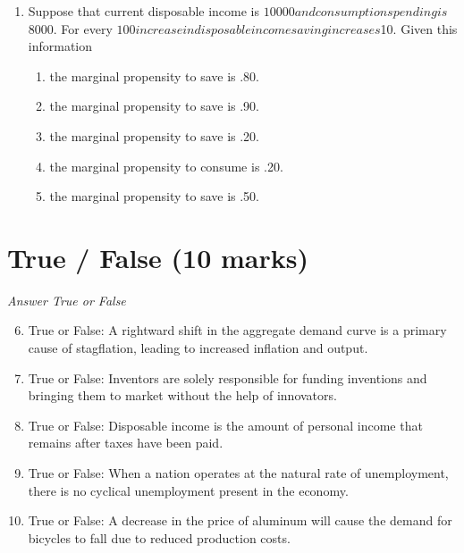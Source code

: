 \documentclass[12pt]{article}
\begin{document}
\begin{enumerate}[label=\arabic*.]
\begin{enumerate}[label=(\alph*)]
    \item A method that minimizes the time taken to produce a product
    \item A method that uses more of all inputs to increase output
    \item A method that produces the highest quantity of output
    \item A method that relies solely on the latest technology
    \item A method that achieves the fastest production speed regardless of resource usage
\end{enumerate}
\item Suppose that current disposable income is $10000 and consumption spending is $8000. For every $100 increase in disposable income saving increases $10. Given this information
\begin{enumerate}[label=(\alph*)]
    \item the marginal propensity to save is .80.
    \item the marginal propensity to save is .90.
    \item the marginal propensity to save is .20.
    \item the marginal propensity to consume is .20.
    \item the marginal propensity to save is .50.
\end{enumerate}
\end{enumerate}

\section*{True / False (10 marks)}
\textit{Answer True or False}
\begin{enumerate}[label=\arabic*.]
\setcounter{enumi}{5}
\item True or False: A rightward shift in the aggregate demand curve is a primary cause of stagflation, leading to increased inflation and output.
\item True or False: Inventors are solely responsible for funding inventions and bringing them to market without the help of innovators.
\item True or False: Disposable income is the amount of personal income that remains after taxes have been paid.
\item True or False: When a nation operates at the natural rate of unemployment, there is no cyclical unemployment present in the economy.
\item True or False: A decrease in the price of aluminum will cause the demand for bicycles to fall due to reduced production costs.
\end{enumerate}
\end{document}
